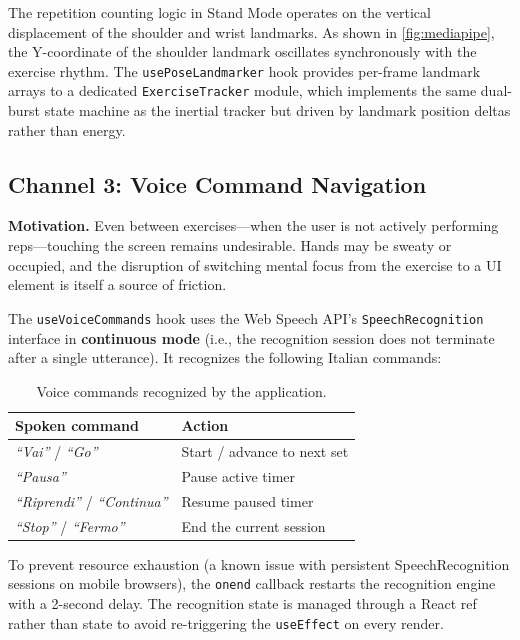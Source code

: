 \documentclass[11pt]{article}
\begin{document}
The repetition counting logic in Stand Mode operates on the vertical displacement of the shoulder and wrist landmarks. As shown in \cref{fig:mediapipe}, the Y-coordinate of the shoulder landmark oscillates synchronously with the exercise rhythm. The \texttt{usePoseLandmarker} hook provides per-frame landmark arrays to a dedicated \texttt{ExerciseTracker} module, which implements the same dual-burst state machine as the inertial tracker but driven by landmark position deltas rather than energy.

\subsection{Channel 3: Voice Command Navigation}

\textbf{Motivation.} Even between exercises—when the user is not actively performing reps—touching the screen remains undesirable. Hands may be sweaty or occupied, and the disruption of switching mental focus from the exercise to a UI element is itself a source of friction.

The \texttt{useVoiceCommands} hook uses the Web Speech API's \texttt{SpeechRecognition} interface in \textbf{continuous mode} (i.e., the recognition session does not terminate after a single utterance). It recognizes the following Italian commands:

\begin{table}[H]
\centering
\small
\begin{tabular}{ll}
\toprule
\textbf{Spoken command} & \textbf{Action} \\
\midrule
\textit{``Vai''} / \textit{``Go''} & Start / advance to next set \\
\textit{``Pausa''} & Pause active timer \\
\textit{``Riprendi''} / \textit{``Continua''} & Resume paused timer \\
\textit{``Stop''} / \textit{``Fermo''} & End the current session \\
\bottomrule
\end{tabular}
\caption{Voice commands recognized by the application.}
\label{tab:voice}
\end{table}

To prevent resource exhaustion (a known issue with persistent SpeechRecognition sessions on mobile browsers), the \texttt{onend} callback restarts the recognition engine with a 2-second delay. The recognition state is managed through a React ref rather than state to avoid re-triggering the \texttt{useEffect} on every render.
\end{document}
